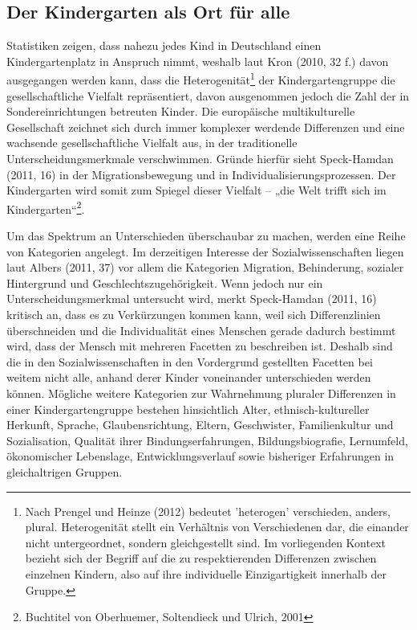 \subsection{Der Kindergarten als Ort für alle}\label{OrtFuerAlle}
Statistiken zeigen, dass nahezu jedes Kind in Deutschland einen Kindergartenplatz in Anspruch nimmt, weshalb laut Kron (2010, 32 f.) davon ausgegangen werden kann, dass die Heterogenität\footnote{Nach Prengel und Heinze (2012) bedeutet 'heterogen' verschieden, anders, plural. Heterogenität stellt ein Verhältnis von Verschiedenen dar, die einander nicht untergeordnet, sondern gleichgestellt sind. Im vorliegenden Kontext bezieht sich der Begriff auf die zu respektierenden Differenzen zwischen einzelnen Kindern, also auf ihre individuelle Einzigartigkeit innerhalb der Gruppe.}
der Kindergartengruppe die gesellschaftliche Vielfalt repräsentiert, davon ausgenommen jedoch die Zahl der in Sondereinrichtungen betreuten Kinder. Die europäische multikulturelle Gesellschaft zeichnet sich durch immer komplexer werdende Differenzen und eine wachsende gesellschaftliche Vielfalt aus, in der traditionelle Unterscheidungsmerkmale verschwimmen. Gründe hierfür sieht Speck-Hamdan (2011, 16) in der Migrationsbewegung und in Individualisierungsprozessen. Der Kindergarten wird somit zum Spiegel dieser Vielfalt – „die Welt trifft sich im Kindergarten“\footnote{Buchtitel von Oberhuemer, Soltendieck und Ulrich, 2001}.
 
Um das Spektrum an Unterschieden überschaubar zu machen, werden eine Reihe von Kategorien angelegt. Im derzeitigen Interesse der Sozialwissenschaften liegen laut Albers (2011, 37) vor allem die Kategorien Migration, Behinderung, sozialer Hintergrund und Geschlechtszugehörigkeit.
Wenn jedoch nur ein Unterscheidungsmerkmal untersucht wird, merkt 
Speck-Hamdan (2011, 16) kritisch an, dass es zu Verkürzungen kommen kann, weil sich Differenzlinien überschneiden und die Individualität eines Menschen gerade dadurch bestimmt wird, dass der Mensch mit mehreren Facetten zu beschreiben ist. Deshalb sind die in den Sozialwissenschaften in den Vordergrund gestellten Facetten bei weitem nicht alle, anhand derer Kinder voneinander unterschieden werden können. Mögliche weitere Kategorien zur Wahrnehmung pluraler Differenzen in einer Kindergartengruppe bestehen hinsichtlich Alter, ethnisch-kultureller Herkunft, Sprache, Glaubensrichtung, Eltern, Geschwister, Familienkultur und Sozialisation, Qualität ihrer Bindungserfahrungen, Bildungsbiografie, Lernumfeld, ökonomischer Lebenslage, Entwicklungsverlauf sowie bisheriger Erfahrungen in gleichaltrigen Gruppen. 

